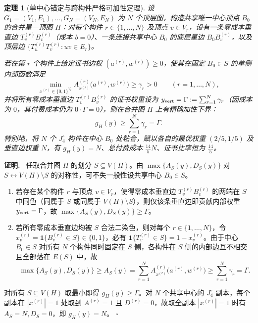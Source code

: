 \documentclass[11pt,a4paper]{ctexart}
\newtheorem{theorem}{定理}[section]
\theoremstyle{definition}
\newenvironment{proofcn}{\par\noindent\textbf{证明.}\ }{\hfill$\square$\par}
\newcommand{\1}{\boldsymbol 1}
\newcommand{\0}{\boldsymbol 0}
\begin{document}
\begin{theorem}[单中心锚定与跨构件严格可加性定理]\label{thm:anchor_additive}
设 $G_1=(V_1,E_1),\dots,G_N=(V_N,E_N)$ 为 $N$ 个顶层图，构造共享唯一中心顶点 $B_0$ 的合并星—顶图 $H$：对每个构件 $r\in\{1,\dots,N\}$ 及顶点 $v\in V_r$，设有一条零成本垂直边 $T_v^{(r)}B_v^{(r)}$（成本 $b=0$）、一条连接共享中心 $B_0$ 的底层星边 $B_0B_v^{(r)}$，以及顶层边 $\{T_u^{(r)}T_v^{(r)}:uv\in E_r\}$。

若在第 $r$ 个构件上给定证书边权 $(a^{(r)},w^{(r)})\ge 0$，使其在固定 $B_0\in S$ 的单侧内部函数满足
\begin{equation}\label{eq:single_side_cond}
 \min_{x^{(r)}\in\{0,1\}^{V_r}} A_{x^{(r)}}^{(r)}\bigl(a^{(r)},w^{(r)}\bigr)\ge \gamma_r > 0\qquad (r=1,\dots,N),
\end{equation}
并将所有零成本垂直边 $T_v^{(r)}B_v^{(r)}$ 的证书权重设为 $y_{\rm vert}=\Gamma:=\sum_{r=1}^N \gamma_r$（因成本为 $0$，其付费成本仍为 $0\cdot\Gamma=0$），则在合并图 $H$ 上有精确加性下界：
\begin{equation}\label{eq:strict_add}
 \boxed{g_H(y)\ge \sum_{r=1}^N \gamma_r = \Gamma.}
\end{equation}
特别地，将 $N$ 个 $J_4^\circ$ 构件在中心 $B_0$ 处粘合，赋以各自的最优权重 $(2/5,1/5)$ 及垂直边权重 $N$，有 $g_H(y)=N$、总付费成本 $\frac{14}{5}N$、证书比率恒为 $\frac{14}{5}$。
\end{theorem}
\begin{proofcn}
任取合并图 $H$ 的划分 $S\subseteq V(H)$。由 $\max\{A_S(y),D_S(y)\}$ 对 $S\leftrightarrow V(H)\setminus S$ 的对称性，可不失一般性设共享中心 $B_0\in S$。
\begin{enumerate}[label=(\roman*)]
\item 若存在某个构件 $r$ 与顶点 $v\in V_r$，使得零成本垂直边 $T_v^{(r)}B_v^{(r)}$ 的两端在 $S$ 中同色（同属于 $S$ 或同属于 $V(H)\setminus S$），则仅该条垂直边即贡献内部权重 $y_{\rm vert}=\Gamma$，故 $\max\{A_S(y),D_S(y)\}\ge\Gamma$。
\item 若所有零成本垂直边均被 $S$ 合法二染色，则对每个 $r\in\{1,\dots,N\}$，令 $x_v^{(r)}=\1\{B_v^{(r)}\in S\}\in\{0,1\}$，必有 $\1\{T_v^{(r)}\in S\}=1-x_v^{(r)}$。由于中心 $B_0\in S$ 对所有 $N$ 个构件同时固定在 $S$ 侧，各构件在 $S$ 侧的内部边互不相交且全部落在 $E(S)$ 中，故
\[
 \max\{A_S(y),D_S(y)\}\ge A_S(y)=\sum_{r=1}^N A_{x^{(r)}}^{(r)}\bigl(a^{(r)},w^{(r)}\bigr)\ge \sum_{r=1}^N \gamma_r=\Gamma.
\]
\end{enumerate}
对所有 $S\subseteq V(H)$ 取最小即得 $g_H(y)\ge\Gamma$。对 $N$ 个共享中心的 $J_4^\circ$ 副本，每个副本在 $|x^{(r)}|=1$ 处取到 $A^{(r)}=1$ 且 $D^{(r)}=0$，故取全副本 $|x^{(r)}|=1$ 时有 $A_S=N,D_S=0$，即 $g_H(y)=N$。
\end{proofcn}
\end{document}
